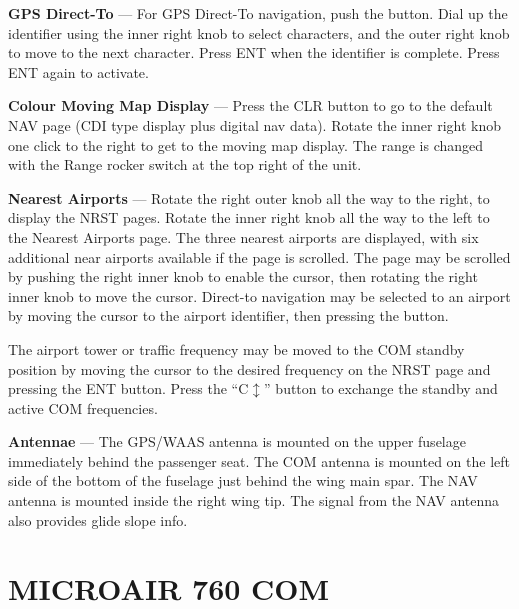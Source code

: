 \textbf{GPS Direct-To} --- For GPS Direct-To navigation, push the \directto button. Dial up the identifier using the inner right knob to select characters, and the outer right knob to move to the next character. Press ENT when the identifier is complete. Press ENT again to activate.

\textbf{Colour Moving Map Display} --- Press the CLR button to go to the default NAV page (CDI type display plus digital nav data). Rotate the inner right knob one click to the right to get to the moving map display. The range is changed with the Range rocker switch at the top right of the unit.

\textbf{Nearest Airports} --- Rotate the right outer knob all the way to the right, to display the NRST pages. Rotate the inner right knob all the way to the left to the Nearest Airports page. The three nearest airports are displayed, with six additional near airports available if the page is scrolled. The page may be scrolled by pushing the right inner knob to enable the cursor, then rotating the right inner knob to move the cursor. Direct-to navigation may be selected to an airport by moving the cursor to the airport identifier, then pressing the \directto button.

The airport tower or traffic frequency may be moved to the COM standby position by moving the cursor to the desired frequency on the NRST page and pressing the ENT button. Press the ``C$\updownarrow$'' button to exchange the standby and active COM frequencies.

\textbf{Antennae} --- The GPS/WAAS antenna is mounted on the upper fuselage immediately behind the passenger seat. The COM antenna is mounted on the left side of the bottom of the fuselage just behind the wing main spar. The NAV antenna is mounted inside the right wing tip. The signal from the NAV antenna also provides glide slope info.

\section{MICROAIR 760 COM}


